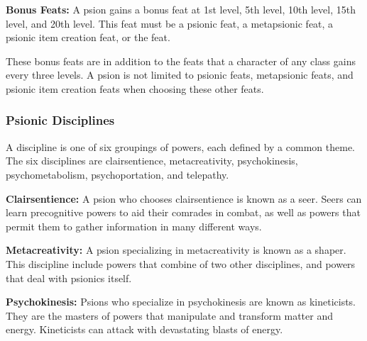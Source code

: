 

\textbf{Bonus Feats:} A psion gains a bonus feat at 1st level, 5th level, 10th level, 15th level, and 20th level. This feat must be a psionic feat, a metapsionic feat, a psionic item creation feat, or the  feat.

These bonus feats are in addition to the feats that a character of any class gains every three levels. A psion is not limited to psionic feats, metapsionic feats, and psionic item creation feats when choosing these other feats.

\subsubsection{Psionic Disciplines}
A discipline is one of six groupings of powers, each defined by a common theme. The six disciplines are clairsentience, metacreativity, psychokinesis, psychometabolism, psychoportation, and telepathy.

\textbf{Clairsentience:} A psion who chooses clairsentience is known as a seer. Seers can learn precognitive powers to aid their comrades in combat, as well as powers that permit them to gather information in many different ways.

\textbf{Metacreativity:} A psion specializing in metacreativity is known as a shaper. This discipline include powers that combine of two other disciplines, and powers that deal with psionics itself. %

\textbf{Psychokinesis:} Psions who specialize in psychokinesis are known as kineticists. They are the masters of powers that manipulate and transform matter and energy. Kineticists can attack with devastating blasts of energy.

